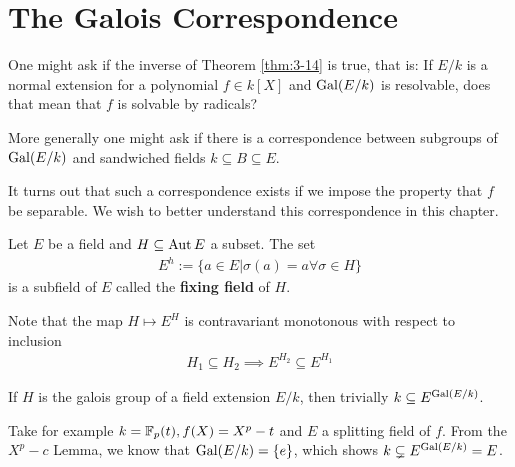 \section{The Galois Correspondence}

One might ask if the inverse of Theorem \ref{thm:3-14} is true, that is: 
If $E/k$ is a normal extension for a polynomial $f \in k[X]$ and $\operatorname{Gal}(E/k)$ is resolvable, does that mean that $f$ is solvable by radicals?

More generally one might ask if there is a correspondence between subgroups of $\operatorname{Gal}(E/k)$ and sandwiched fields $k \subseteq B \subseteq E$.

It turns out that such a correspondence exists if we impose the property that $f$ be separable.
We wish to better understand this correspondence in this chapter.

\begin{dfn}[]
  Let $E$ be a field and $H \subseteq \operatorname{Aut} E$ a subset. The set
  \begin{align*}
    E^{h} := \{a \in E \big\vert \sigma(a) = a \forall \sigma \in H\}
  \end{align*}
  is a subfield of $E$ called the \textbf{fixing field} of $H$.
\end{dfn}
Note that the map $H \mapsto E^{H}$ is contravariant monotonous with respect to inclusion
\begin{align*}
  H_1 \subseteq H_2 \implies E^{H_2} \subseteq E^{H_1}
\end{align*}

If $H$ is the galois group of a field extension $E/k$, then trivially $k \subseteq E^{\operatorname{Gal}(E/k)}$.

\begin{ex}[]
  Take for example $k = \mathbb{F}_p(t), f(X) = X^{p}-t$ and $E$ a splitting field of $f$.
  From the $X^{p}-c$ Lemma, we know that $\operatorname{Gal}(E/k) = \{e\}$, which shows $k \subsetneq E^{\operatorname{Gal}(E/k)} = E$.
\end{ex}
